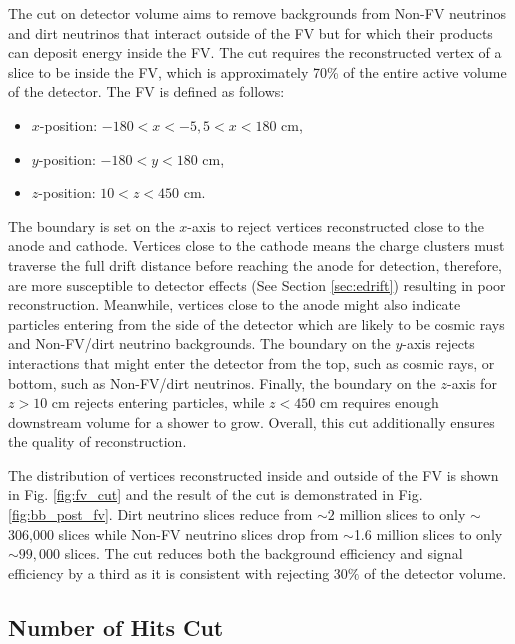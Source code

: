 The cut on detector volume aims to remove backgrounds from Non-FV neutrinos and dirt neutrinos that interact outside of the FV but for which their products can deposit energy inside the FV. 
The cut requires the reconstructed vertex of a slice to be inside the FV, which is approximately 70\% of the entire active volume of the detector. 
The FV is defined as follows:
\begin{itemize}
        \item $x$-position: $- 180 < x < -5 , 5 < x < 180$ cm,
        \item $y$-position: $-180 < y < 180$ cm,
        \item $z$-position: $10 < z < 450$ cm.
\end{itemize}
The boundary is set on the $x$-axis to reject vertices reconstructed close to the anode and cathode.
Vertices close to the cathode means the charge clusters must traverse the full drift distance before reaching the anode for detection, therefore, are more susceptible to detector effects (See Section \ref{sec:edrift}) resulting in poor reconstruction.
Meanwhile, vertices close to the anode might also indicate particles entering from the side of the detector which are likely to be cosmic rays and Non-FV/dirt neutrino backgrounds. 
The boundary on the $y$-axis rejects interactions that might enter the detector from the top, such as cosmic rays, or bottom, such as Non-FV/dirt neutrinos.
Finally, the boundary on the $z$-axis for $z > 10$ cm rejects entering particles, while $z < 450$ cm requires enough downstream volume for a shower to grow.
Overall, this cut additionally ensures the quality of reconstruction.

The distribution of vertices reconstructed inside and outside of the FV is shown in Fig. \ref{fig:fv_cut} and the result of the cut is demonstrated in Fig. \ref{fig:bb_post_fv}.
Dirt neutrino slices reduce from $\sim2$ million slices to only $\sim$306,000 slices while Non-FV neutrino slices drop from $\sim$1.6 million slices to only $\sim99,000$ slices.
The cut reduces both the background efficiency and signal efficiency by a third as it is consistent with rejecting $30\%$ of the detector volume.

\subsection{Number of Hits Cut}
\label{sec:hit_cut}

